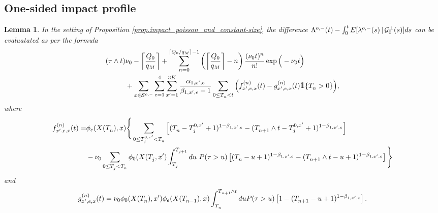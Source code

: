 \documentclass[10pt, article,table]{article}
\newtheorem{lemma}[thm]{Lemma}
\begin{document}
\subsection{One-sided impact profile}
\begin{lemma}\label{lemma.implementation_of_one-sided_impact}
 In the setting of Proposition \ref{prop.impact_poisson_and_constant-size}, the difference $\weakDeflCompensator(t) - \intzerot \Expectation[\weakDeflIntensity(s)\,\vert\,\sigmaAlgebraG_{0}\orthogonal(s)]ds$ can be evaluatated as per the formula
 \begin{equation}\label{eq.evaluation_of_one-sided_impact}
 \begin{split}
  (\terminationTime\wedge t) &\baseRate_{0}
  - \left\lceil \frac{\metaorderSize}{q_{M}}\right\rceil
  + \sum_{n=0}^{\lceil\metaorderSize/q_{M}\rceil -1}
  \left( \left\lceil \frac{\metaorderSize}{q_{M}}\right\rceil - n\right)\frac{(\baseRate_{0} t)^n}{n!} \exp \Big( - \baseRate_{0} t \Big)
  \\
  &+
  \sum_{x\in\weakDeflSpace}\sum_{e=1}^{4}\sum_{\xone=1}^{3K}
  \frac{\impCoef_{1,\xone,e}}{\decCoef_{1,\xone,e} -1}
  \sum_{0\leq \arrivalTimes[]_n < t}
  \Big(
  f^{(n)}_{\xone,e,x}(t) - g^{(n)}_{\xone,e,x}(t) \one\lbrace \arrivalTimes[]_n >0\rbrace
  \Big),
  \end{split}
 \end{equation}
where 
\begin{equation*}
\begin{split}
 f^{(n)}_{\xone,e,x} (t)
 =&
 \transProb_{e} (\stateVariable(\arrivalTimes[]_n),x)
 \Bigg\lbrace
 \sum_{0\leq \arrivalTimes[0,\xone]_j < \arrivalTimes[]_n}
 \left[
 (\arrivalTimes[]_n - \arrivalTimes[0,\xone]_j +1)^{1-\decCoef_{1,\xone,e}}
 -
 (\arrivalTimes[]_{n+1}\wedge t - \arrivalTimes[0,\xone]_j +1)^{1-\decCoef_{1,\xone,e}}
 \right]
 \\
 &-
 \baseRate_{0} \sum_{0\leq \arrivalTimes[]_j < \arrivalTimes[]_n}
 \transProb_{0}(\stateVariable(\arrivalTimes[]_j,\xone)
 \int_{\arrivalTimes[]_j}^{\arrivalTimes[]_{j+1}}
 du \, \,  \Prob(\terminationTime>u)
 \left[
 (\arrivalTimes[]_n - u +1)^{1-\decCoef_{1,\xone,e}}
 -
 (\arrivalTimes[]_{n+1}\wedge t - u +1)^{1-\decCoef_{1,\xone,e}}
 \right]
 \Bigg\rbrace
 \end{split}
\end{equation*}
and 
\begin{equation*}
 g^{(n)}_{\xone,e,x} (t) = 
 \baseRate_{0} \transProb_{0} (\stateVariable(\arrivalTimes[]_{n}),\xone)\transProb_{e} (\stateVariable(\arrivalTimes[]_{n-1}),x)
 \int_{\arrivalTimes[]_n}^{\arrivalTimes[]_{n+1}\wedge t}
 du \Prob(\terminationTime>u)
 \left[
 1 -
 (\arrivalTimes[]_{n+1} - u +1)^{1-\decCoef_{1,\xone,e}}
 \right].
\end{equation*}
\end{lemma}
\end{document}
